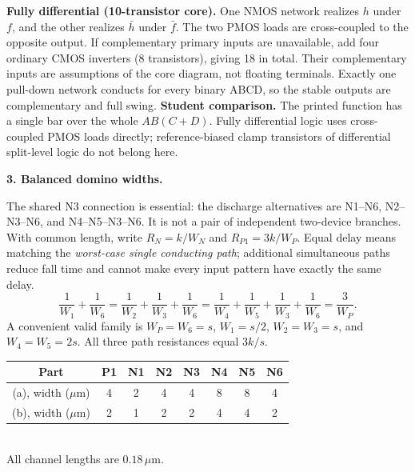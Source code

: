 \documentclass[10pt]{article}
\newcommand{\mos}[4]{\begin{scope}[shift={(#1,#2)}]
\draw (0,.24)--(0,-.24);\draw (0,.20)--(.25,.20)--(.25,.5);
\draw (0,-.20)--(.25,-.20)--(.25,-.5);\draw (-.16,.23)--(-.16,-.23);
\ifnum#4=1\draw (-.26,0) circle (.06);\draw (-.75,0)--(-.32,0);\else\draw (-.75,0)--(-.16,0);\fi
\node[anchor=east,font=\scriptsize] at (-.76,0) {$#3$};\end{scope}}
\newcommand{\ground}[2]{\draw (#1,#2)--(#1,{#2-.12});\draw ({#1-.17},{#2-.12})--({#1+.17},{#2-.12});\draw ({#1-.11},{#2-.20})--({#1+.11},{#2-.20});}
\newcommand{\rail}[3]{\draw (#1,#2)--(#1,{#2+.14});\node[above,font=\scriptsize] at (#1,{#2+.14}) {$#3$};}
\begin{document}
\textbf{Fully differential (10-transistor core).} One NMOS network realizes $h$ under $f$, and the other realizes $\bar h$ under $\bar f$. The two PMOS loads are cross-coupled to the opposite output. If complementary primary inputs are unavailable, add four ordinary CMOS inverters (8 transistors), giving 18 in total. Their complementary inputs are assumptions of the core diagram, not floating terminals. Exactly one pull-down network conducts for every binary ABCD, so the stable outputs are complementary and full swing.
\textbf{Student comparison.} The printed function has a single bar over the whole $AB(C+D)$. Fully differential logic uses cross-coupled PMOS loads directly; reference-biased clamp transistors of differential split-level logic do not belong here.

\newpage\textbf{3. Balanced domino widths.}
\begin{center}\end{center}
The shared N3 connection is essential: the discharge alternatives are N1--N6, N2--N3--N6, and N4--N5--N3--N6. It is not a pair of independent two-device branches. With common length, write $R_N=k/W_N$ and $R_{P1}=3k/W_P$. Equal delay means matching the \emph{worst-case single conducting path}; additional simultaneous paths reduce fall time and cannot make every input pattern have exactly the same delay.
\[
\frac1{W_1}+\frac1{W_6}=\frac1{W_2}+\frac1{W_3}+\frac1{W_6}
=\frac1{W_4}+\frac1{W_5}+\frac1{W_3}+\frac1{W_6}=\frac3{W_P}.
\]
A convenient valid family is $W_P=W_6=s$, $W_1=s/2$, $W_2=W_3=s$, and $W_4=W_5=2s$. All three path resistances equal $3k/s$.
\begin{center}\begin{tabular}{c*{7}{c}}\toprule
Part & P1 & N1 & N2 & N3 & N4 & N5 & N6\\\midrule
(a), width ($\mu$m)&4&2&4&4&8&8&4\\
(b), width ($\mu$m)&2&1&2&2&4&4&2\\\bottomrule
\end{tabular}\\All channel lengths are $0.18\,\mu$m.\end{center}
\end{document}
